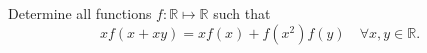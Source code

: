 Determine all functions $ f: \mathbb{R} \mapsto \mathbb{R}$ such that\[ x f(x + xy) = x f(x) + f \left( x^2 \right) f(y) \quad  \forall  x,y \in \mathbb{R}.\]